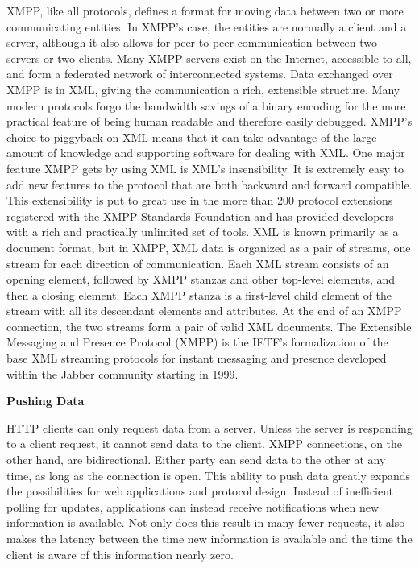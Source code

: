       XMPP, like all protocols, defines a format for moving data between two or more communicating entities. In XMPP’s case, the entities are normally a client and a server, although it also allows for peer-to-peer communication between two servers or two clients. Many XMPP servers exist on the Internet, accessible to all, and form a federated network of interconnected systems. Data exchanged over XMPP is in XML, giving the communication a rich, extensible structure. Many modern protocols forgo the bandwidth savings of a binary encoding for the more practical feature of being human readable and therefore easily debugged. XMPP’s choice to piggyback on XML means that it can take advantage of the large amount of knowledge and supporting software for dealing with XML. One major feature XMPP gets by using XML is XML’s insensibility. It is extremely easy to add new features to the protocol that are both backward and forward compatible. This extensibility is put to great use in the more than 200 protocol extensions registered with the XMPP Standards Foundation and has provided developers with a rich and practically unlimited set of tools. XML is known primarily as a document format, but in XMPP, XML data is organized as a pair of streams, one stream for each direction of communication. Each XML stream consists of an opening element, followed by XMPP stanzas and other top-level elements, and then a closing element. Each XMPP stanza is a first-level child element of the stream with all its descendant elements and attributes. At the end of an XMPP connection, the two streams form a pair of valid XML documents.
      The Extensible Messaging and Presence Protocol (XMPP) is the IETF’s formalization of the base XML streaming protocols for instant messaging and presence developed within the Jabber community starting in 1999\cite{xmpp}.

      \textbf{Pushing Data}

      HTTP clients can only request data from a server. Unless the server is responding to a client request,
      it cannot send data to the client. XMPP connections, on the other hand, are bidirectional. Either party
      can send data to the other at any time, as long as the connection is open.
      This ability to push data greatly expands the possibilities for web applications and protocol design.
      Instead of inefficient polling for updates, applications can instead receive notifications when new
      information is available. Not only does this result in many fewer requests, it also makes the latency
      between the time new information is available and the time the client is aware of this information
      nearly zero.


